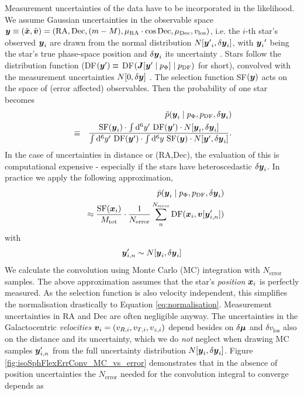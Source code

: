 
Measurement uncertainties of the data have to be incorporated in the likelihood. We assume Gaussian uncertainties in the observable space $\boldsymbol{y} \equiv (\tilde{\boldsymbol{x}},\tilde{\boldsymbol{v}})=(\text{RA},\text{Dec},(m-M),\mu_\text{RA} \cdot \cos \text{Dec},\mu_\text{Dec},v_\text{los})$, i.e. the $i$-th star's observed $\boldsymbol{y}_i$ are drawn from the normal distribution $N[{\boldsymbol{y}'}_i,\delta \boldsymbol{y}_i]$, with ${\boldsymbol{y}_i}'$ being the star's true phase-space position and $\delta \boldsymbol{y}_i$ its uncertainty . Stars follow the distribution function (DF$(\boldsymbol{y}') \equiv$ DF$(\boldsymbol{J}[\boldsymbol{y}' \mid p_\Phi] \mid p_\text{DF})$ for short), convolved with the measurement uncertainties $N[0,\delta \boldsymbol{y}]$ . The selection function SF$(\boldsymbol{y})$ acts on the space of (error affected) observables. Then the probability of one star becomes
\begin{eqnarray*}
&&\tilde{p}(\boldsymbol{y}_i \mid p_\Phi,p_\text{DF},\delta \boldsymbol{y}_i)\\
& \equiv& \frac{\text{SF}(\boldsymbol{y}_i) \cdot \int \mathop{}\!\mathrm{d^6} y' \  \text{DF}(\boldsymbol{y}') \cdot N[\boldsymbol{y}_i,\delta \boldsymbol{y}_i]}{\int \mathop{}\!\mathrm{d^6}y'  \  \text{DF}(\boldsymbol{y}')  \cdot  \int \mathop{}\!\mathrm{d^6} y \  \text{SF}(\boldsymbol{y})  \cdot N[\boldsymbol{y}',\delta \boldsymbol{y}_i]}.
\end{eqnarray*}
In the case of uncertainties in distance or (RA,Dec), the evaluation of this is computational expensive - especially if the stars have heteroscedastic $\delta \boldsymbol{y}_i$. In practice we apply the following approximation,
\begin{eqnarray}
&&\tilde{p}(\boldsymbol{y}_i \mid p_\Phi,p_\text{DF},\delta \boldsymbol{y}_i) \nonumber\\
&&\approx \frac{ \text{SF}(\boldsymbol{x}_i)}{M_\text{tot}} \cdot \frac{1}{N_\text{error}} \sum_n^{N_\text{error}}  \text{DF}(\boldsymbol{x}_i,\boldsymbol{v}[\boldsymbol{y}'_{i,n}]) \label{eq:errorconv}
\end{eqnarray}
with
\begin{eqnarray}
\boldsymbol{y}'_{i,n} \sim N[\boldsymbol{y}_i,\delta \boldsymbol{y}_i]\nonumber
\end{eqnarray}
We calculate the convolution using Monte Carlo (MC) integration with $N_\text{error}$ samples. The above approximation assumes that the star's \emph{position} $\boldsymbol{x}_i$ is perfectly measured. As the selection function is also velocity independent, this simplifies the normalisation drastically to Equation \ref{eq:normalisation}. Measurement uncertainties in $\mathrm{RA}$ and $\mathrm{Dec}$ are often negligible anyway. The uncertainties in the Galactocentric \emph{velocities} $\boldsymbol{v}_i = (v_{R,i},v_{T,i},v_{z,i})$ depend besides on $\delta \boldsymbol{\mu}$ and $\delta v_\text{los}$ also on the distance and its uncertainty, which we do \emph{not} neglect when drawing MC samples $\boldsymbol{y}'_{i,n}$ from the full uncertainty distribution $N[\boldsymbol{y}_i,\delta \boldsymbol{y}_i]$. Figure \ref{fig:isoSphFlexErrConv_MC_vs_error} demonstrates that in the absence of position uncertainties the $N_\text{error}$ needed for the convolution integral to converge depends as
